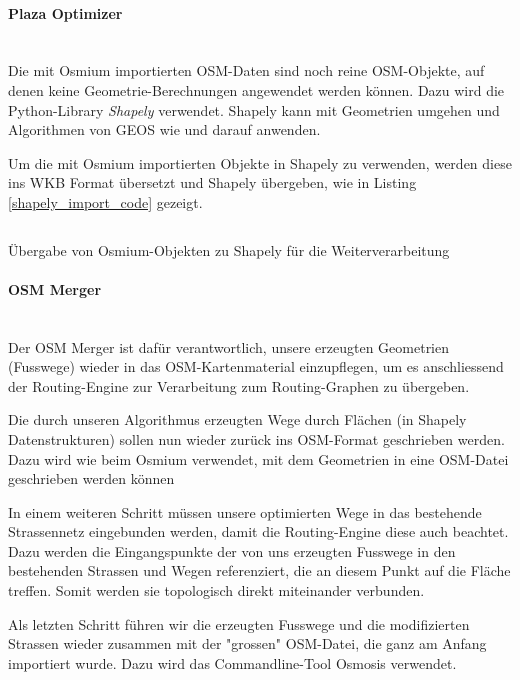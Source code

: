 \paragraph{Plaza Optimizer}\label{par:Plaza Optimizer}~\\
Die mit Osmium importierten \ac{OSM}-Daten sind noch reine \ac{OSM}-Objekte, auf denen keine Geometrie-Berechnungen angewendet werden können. Dazu wird die Python-Library \emph{Shapely}\cite{shapely} verwendet. Shapely kann mit Geometrien umgehen und Algorithmen von \ac{GEOS} wie  und  darauf anwenden.

Um die mit Osmium importierten Objekte in Shapely zu verwenden, werden diese ins \ac{WKB} Format übersetzt und Shapely übergeben, wie in Listing \ref{shapely_import_code} gezeigt.

\begin{listing}[ht]
    \inputminted{python}{projectdoc/listing/shapely_import.py}
    \caption[Einlesen OSM Objekte in Shapely]{Übergabe von Osmium-Objekten zu Shapely für die Weiterverarbeitung}
    \label{shapely_import_code}
\end{listing}



\paragraph{OSM Merger}\label{par:OSM Merger}~\\
Der OSM Merger ist dafür verantwortlich, unsere erzeugten Geometrien (Fusswege) wieder in das \ac{OSM}-Kartenmaterial einzupflegen, um es anschliessend der Routing-Engine zur Verarbeitung zum Routing-Graphen zu übergeben.

Die durch unseren Algorithmus erzeugten Wege durch Flächen (in Shapely Datenstrukturen) sollen nun wieder zurück ins \ac{OSM}-Format geschrieben werden. Dazu wird wie beim  Osmium verwendet, mit dem Geometrien in eine OSM-Datei geschrieben werden können

In einem weiteren Schritt müssen unsere optimierten Wege in das bestehende Strassennetz eingebunden werden, damit die Routing-Engine diese auch beachtet. Dazu werden die Eingangspunkte der von uns erzeugten Fusswege in den bestehenden Strassen und Wegen referenziert, die an diesem Punkt auf die Fläche treffen. Somit werden sie topologisch direkt miteinander verbunden.

Als letzten Schritt führen wir die erzeugten Fusswege und die modifizierten Strassen wieder zusammen mit der "grossen" \ac{OSM}-Datei, die ganz am Anfang importiert wurde. Dazu wird das Commandline-Tool Osmosis \cite{osmosis} verwendet.

